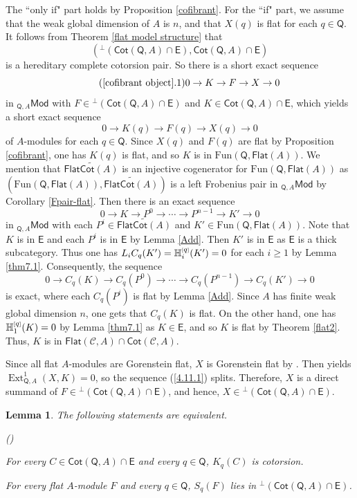 \documentclass{amsart}
\theoremstyle{bfupright head,slanted body}
\theoremstyle{bfupright head,upright body}
\theoremstyle{fixed bf head,slanted body}
\newtheorem{lem}[res]{Lemma}            \newtheorem*{lem*}{Lemma}
\theoremstyle{fixed bf head,upright body}
\theoremstyle{numbered paragraph}
\newlength{\thmlistleft}        %
\newlength{\thmlistright}       %
\newlength{\thmlistpartopsep}   %
\newlength{\thmlisttopsep}      %
\newlength{\thmlistparsep}      %
\newlength{\thmlistitemsep}     %
\newcounter{eqc}
\newenvironment{eqc}{\begin{list}{\upshape (\textit{\roman{eqc}})}%
		{\usecounter{eqc}%
			\setlength{\leftmargin}{\thmlistleft}%
			\setlength{\labelwidth}{\thmlistleft}%
			\setlength{\rightmargin}{\thmlistright}%
			\setlength{\partopsep}{\thmlistpartopsep}%
			\setlength{\topsep}{\thmlisttopsep}%
			\setlength{\parsep}{\thmlistparsep}%
			\setlength{\itemsep}{\thmlistitemsep}}}%
	{\end{list}}%
\newenvironment{prf*}[1][Proof]{%
	\begin{proof}[\bf #1]
		\setcounter{equation}{0}
		\renewcommand{\theequation}{\arabic{equation}}}
	{\end{proof}
}
\numberwithin{equation}{res}
\newcommand{\FC}[1]{\mathsf{FlatCot}(#1)}
\newcommand{\Flat}[1]{\mathsf{Flat}(#1)}
\newcommand{\Cot}[1]{\mathsf{Cot}(#1)}
\newcommand{\Mod}[1]{{_{#1}\mathsf{Mod}}}
\newcommand{\Ext}[4][]{\operatorname{Ext}_{#1}^{#2}(#3,#4)}
\newcommand{\hH}[2][1]{\mathbb{H}_{#1}^{\textnormal{\tiny[}#2\textnormal{\tiny]}}}
\newcommand{\Fun}{\mathrm{Fun}}
\newcommand{\E}{\mathsf{E}}
\newcommand{\C}{\mathcal{C}}
\newcommand{\Q}{\mathsf{Q}}
\begin{document}
\begin{prf*}
The ``only if" part holds by Proposition \ref{cofibrant}. For the ``if" part, we assume that the weak global dimension of $A$ is $n$, and that $X(q)$ is flat for each $q\in\Q$. It follows from Theorem \ref{flat model structure} that $$({^\perp(\Cot{\Q,A}\cap\E)},\Cot{\Q,A}\cap\E)$$
is a hereditary complete cotorsion pair. So there is a short exact sequence
\begin{equation*}\label{4.11.1}
\tag{\ref{cofibrant object}.1}
0\to K\to F \to X \to 0
\end{equation*}
in $\Mod{\Q,A}$ with $F\in{^\perp(\Cot{\Q,A}\cap\E)}$ and $K\in\Cot{\Q,A}\cap\E$, which yields a short exact sequence
$$0 \to K(q) \to F(q) \to X(q) \to 0$$
 of $A$-modules for each $q\in\Q$. Since $X(q)$ and $F(q)$ are flat by Proposition \ref{cofibrant}, one has $K(q)$ is flat, and so $K$ is in $\Fun(\Q,\Flat{A})$. We mention that $\widetilde{\FC{A}}$ is an injective cogenerator for $\Fun(\Q,\Flat{A})$ as $(\Fun(\Q,\Flat{A}), \widetilde{\FC{A}})$ is a left Frobenius pair in $\Mod{\Q,A}$ by Corollary \ref{Fpair-flat}. Then there is an exact sequence
$$0 \to K \to P^0 \to \cdots \to P^{n-1} \to K' \to 0$$
in $\Mod{\Q,A}$ with each $P^i\in\widetilde{\FC{A}}$ and $K'\in\Fun(\Q,\Flat{A})$. Note that $K$ is in $\E$ and each $P^i$ is in $\E$ by Lemma \ref{Add}. Then $K'$ is in $\E$ as $\E$ is a thick subcategory. Thus one has $L_iC_q(K')=\hH[i]{q}(K')=0$ for each $i\geqslant1$ by Lemma \ref{thm7.1}. Consequently, the sequence
$$0 \to C_q(K) \to C_q(P^0) \to \cdots \to C_q(P^{n-1}) \to C_q(K') \to 0$$
is exact, where each $C_q(P^i)$ is flat by Lemma \ref{Add}. Since $A$ has finite weak global dimension $n$, one gets that $C_q(K)$ is flat. On the other hand, one has $\hH[1]{q}(K)=0$ by Lemma \ref{thm7.1} as $K\in\E$, and so $K$ is flat by Theorem \ref{flat2}. Thus, $K$ is in $\Flat{\C,A}\cap\Cot{\C,A}$.

Since all flat $A$-modules are Gorenstein flat, $X$ is Gorenstein flat by \cite[Theorem 3.11]{DLLM}. Then \cite[Theorem 4.11]{SS20} yields $\Ext[\Q,A]{1}{X}{K}=0$, so the sequence (\ref{4.11.1}) splits. Therefore, $X$ is a direct summand of $F\in{^\perp(\Cot{\Q,A}\cap\E)}$, and hence, $X\in{^\perp(\Cot{\Q,A}\cap\E)}$.
\end{prf*}

\begin{lem}\label{lem4.13}
The following statements are equivalent.
\begin{eqc}
\item For every $C\in\Cot{\Q,A}\cap\E$ and every $q\in \Q$, $K_q(C)$ is cotorsion.
\item For every flat $A$-module $F$ and every $q\in \Q$, $S_q(F)$ lies in
      $^\perp(\Cot{\Q,A}\cap\E)$.
\end{eqc}
\end{lem}
\end{document}
